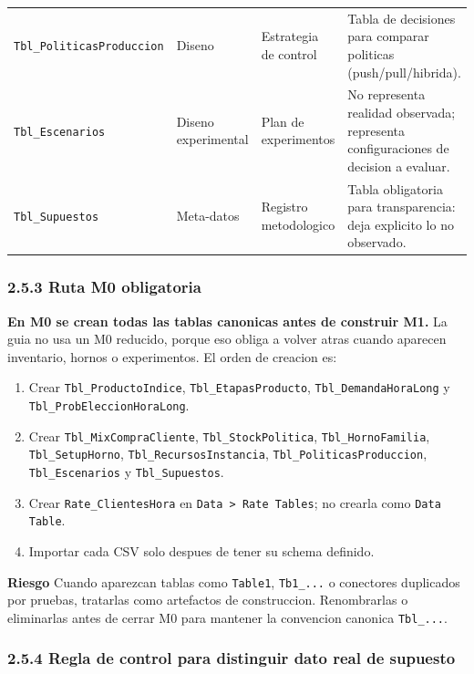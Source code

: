 \documentclass[11pt]{article}
\newcommand{\simio}[1]{\texttt{#1}}
\newcommand{\tabla}[1]{\texttt{#1}}
\newcommand{\risk}{\textcolor{rojoriesgo}{\textbf{Riesgo}}}
\begin{document}
{\begin{longtable}{L{3.5cm}L{2.2cm}L{4.2cm}L{4.5cm}}
\tabla{Tbl\_PoliticasProduccion} & Diseno & Estrategia de control & Tabla de decisiones para comparar politicas (push/pull/hibrida). \\
\tabla{Tbl\_Escenarios} & Diseno experimental & Plan de experimentos & No representa realidad observada; representa configuraciones de decision a evaluar. \\
\tabla{Tbl\_Supuestos} & Meta-datos & Registro metodologico & Tabla obligatoria para transparencia: deja explicito lo no observado. \\
\bottomrule
\end{longtable}
}

\subsubsection{2.5.3 Ruta M0 obligatoria}

\textbf{En M0 se crean todas las tablas canonicas antes de construir M1.} La guia no usa un M0 reducido, porque eso obliga a volver atras cuando aparecen inventario, hornos o experimentos. El orden de creacion es:
\begin{enumerate}
  \item Crear \tabla{Tbl\_ProductoIndice}, \tabla{Tbl\_EtapasProducto}, \tabla{Tbl\_DemandaHoraLong} y \tabla{Tbl\_ProbEleccionHoraLong}.
  \item Crear \tabla{Tbl\_MixCompraCliente}, \tabla{Tbl\_StockPolitica}, \tabla{Tbl\_HornoFamilia}, \tabla{Tbl\_SetupHorno}, \tabla{Tbl\_RecursosInstancia}, \tabla{Tbl\_PoliticasProduccion}, \tabla{Tbl\_Escenarios} y \tabla{Tbl\_Supuestos}.
  \item Crear \tabla{Rate\_ClientesHora} en \simio{Data > Rate Tables}; no crearla como \simio{Data Table}.
  \item Importar cada CSV solo despues de tener su schema definido.
\end{enumerate}

\risk{} Cuando aparezcan tablas como \tabla{Table1}, \tabla{Tb1\_...} o conectores duplicados por pruebas, tratarlas como artefactos de construccion. Renombrarlas o eliminarlas antes de cerrar M0 para mantener la convencion canonica \tabla{Tbl\_...}.

\subsubsection{2.5.4 Regla de control para distinguir dato real de supuesto}
\end{document}
